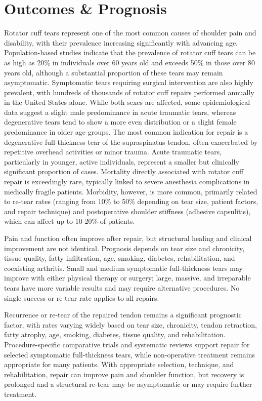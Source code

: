 \section*{Outcomes \& Prognosis}
Rotator cuff tears represent one of the most common causes of shoulder pain and disability, with their prevalence increasing significantly with advancing age. Population-based studies indicate that the prevalence of rotator cuff tears can be as high as 20\% in individuals over 60 years old and exceeds 50\% in those over 80 years old, although a substantial proportion of these tears may remain asymptomatic. Symptomatic tears requiring surgical intervention are also highly prevalent, with hundreds of thousands of rotator cuff repairs performed annually in the United States alone. While both sexes are affected, some epidemiological data suggest a slight male predominance in acute traumatic tears, whereas degenerative tears tend to show a more even distribution or a slight female predominance in older age groups. The most common indication for repair is a degenerative full-thickness tear of the supraspinatus tendon, often exacerbated by repetitive overhead activities or minor trauma. Acute traumatic tears, particularly in younger, active individuals, represent a smaller but clinically significant proportion of cases. Mortality directly associated with rotator cuff repair is exceedingly rare, typically linked to severe anesthesia complications in medically fragile patients. Morbidity, however, is more common, primarily related to re-tear rates (ranging from 10\% to 50\% depending on tear size, patient factors, and repair technique) and postoperative shoulder stiffness (adhesive capsulitis), which can affect up to 10-20\% of patients.

Pain and function often improve after repair, but structural healing and clinical improvement are not identical. Prognosis depends on tear size and chronicity, tissue quality, fatty infiltration, age, smoking, diabetes, rehabilitation, and coexisting arthritis. Small and medium symptomatic full-thickness tears may improve with either physical therapy or surgery; large, massive, and irreparable tears have more variable results and may require alternative procedures. No single success or re-tear rate applies to all repairs.

Recurrence or re-tear of the repaired tendon remains a significant prognostic factor, with rates varying widely based on tear size, chronicity, tendon retraction, fatty atrophy, age, smoking, diabetes, tissue quality, and rehabilitation. Procedure-specific comparative trials and systematic reviews support repair for selected symptomatic full-thickness tears, while non-operative treatment remains appropriate for many patients. With appropriate selection, technique, and rehabilitation, repair can improve pain and shoulder function, but recovery is prolonged and a structural re-tear may be asymptomatic or may require further treatment.

